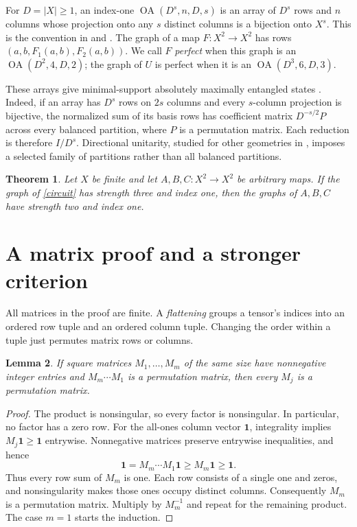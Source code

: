 \documentclass[11pt]{article}
\newtheorem{theorem}{Theorem}
\newtheorem{lemma}[theorem]{Lemma}
\newcommand{\OA}{\operatorname{OA}}
\newcommand{\ind}{\mathbf{1}}
\begin{document}
For $D=|X|\ge1$, an index-one $\OA(D^s,n,D,s)$ is an array of $D^s$
rows and $n$ columns whose projection onto any $s$ distinct columns is a
bijection onto $X^s$. This is the convention in \cite[\S4]{PW} and
\cite[\S III]{GZ}. The graph of a map $F:X^2\to X^2$ has rows
$(a,b,F_1(a,b),F_2(a,b))$. We call $F$ \emph{perfect} when this graph is
an $\OA(D^2,4,D,2)$; the graph of $U$ is perfect when it is an
$\OA(D^3,6,D,3)$.

These arrays give minimal-support absolutely maximally entangled states
\cite{GZ,GALRZ}. Indeed, if an array has $D^s$ rows on $2s$ columns and
every $s$-column projection is bijective, the normalized sum of its basis
rows has coefficient matrix $D^{-s/2}P$ across every balanced partition,
where $P$ is a permutation matrix. Each reduction is therefore $I/D^s$.
Directional unitarity, studied for other geometries in \cite{MPW}, imposes
a selected family of partitions rather than all balanced partitions.

\begin{theorem}\label{main}
Let $X$ be finite and let $A,B,C:X^2\to X^2$ be arbitrary maps. If the
graph of \eqref{circuit} has strength three and index one, then the graphs
of $A,B,C$ have strength two and index one.
\end{theorem}

\section{A matrix proof and a stronger criterion}
All matrices in the proof are finite. A \emph{flattening} groups a
tensor's indices into an ordered row tuple and an ordered column tuple.
Changing the order within a tuple just permutes matrix rows or columns.

\begin{lemma}\label{matrix}
If square matrices $M_1,\ldots,M_m$ of the same size have nonnegative
integer entries and $M_m\cdots M_1$ is a permutation matrix, then every
$M_j$ is a permutation matrix.
\end{lemma}
\begin{proof}
The product is nonsingular, so every factor is nonsingular. In particular,
no factor has a zero row. For the all-ones column vector $\ind$, integrality
implies $M_j\ind\ge\ind$ entrywise. Nonnegative matrices preserve entrywise
inequalities, and hence
\[
 \ind=M_m\cdots M_1\ind\ge M_m\ind\ge\ind.
\]
Thus every row sum of $M_m$ is one. Each row consists of a single one and
zeros, and nonsingularity makes those ones occupy distinct columns.
Consequently $M_m$ is a permutation matrix. Multiply by $M_m^{-1}$ and
repeat for the remaining product. The case $m=1$ starts the induction.
\end{proof}
\end{document}
